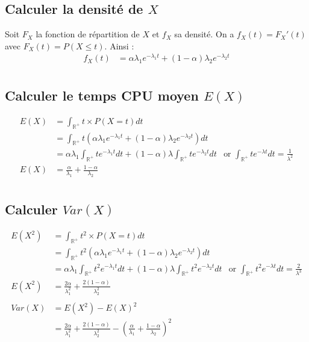 \documentclass[10pt,a4paper,twoside]{article}
\begin{document}
\subsection{Calculer la densité de $X$}
Soit $F_{X}$ la fonction de répartition de $X$ et $f_{X}$ sa densité. On a $f_{X}(t) = F_{X}'(t)$ avec $F_{X}(t) = P(X\leqslant t)$. Ainsi :
\begin{align*}
f_{X}(t) &= \alpha\lambda_{1} e^{-\lambda_{1}t} + (1-\alpha)\lambda_{2} e^{-\lambda_{2}t}\\
\end{align*}

\subsection{Calculer le temps CPU moyen $E(X)$}
\begin{align*}
E(X) &= \int_{\mathbb{R^{+}}} t \times P(X=t) dt\\
&= \int_{\mathbb{R^{+}}} t(\alpha\lambda_{1} e^{-\lambda_{1}t} + (1-\alpha)\lambda_{2} e^{-\lambda_{2}t})dt\\
&= \alpha\lambda_{1} \int_{\mathbb{R^{+}}}te^{-\lambda_{1}t}dt+(1-\alpha)\lambda\int_{\mathbb{R^{+}}}te^{-\lambda_{2}t}dt & \text{or }\int_{\mathbb{R^{+}}}te^{-\lambda t}dt = \frac{1}{\lambda^{2}}\\
E(X) &= \frac{\alpha}{\lambda_{1}}+\frac{1-\alpha}{\lambda_{2}}\\
\end{align*}

\subsection{Calculer $Var(X)$}
\begin{align*}
E(X^{2}) &= \int_{\mathbb{R^{+}}} t^{2} \times P(X=t) dt\\
&= \int_{\mathbb{R^{+}}} t^{2}(\alpha\lambda_{1} e^{-\lambda_{1}t} + (1-\alpha)\lambda_{2} e^{-\lambda_{2}t})dt\\
&= \alpha\lambda_{1} \int_{\mathbb{R^{+}}}t^{2}e^{-\lambda_{1}t}dt+(1-\alpha)\lambda\int_{\mathbb{R^{+}}}t^{2}e^{-\lambda_{2}t}dt & \text{or }\int_{\mathbb{R^{+}}}t^{2}e^{-\lambda t}dt = \frac{2}{\lambda^{3}}\\
E(X^{2}) &= \frac{2\alpha}{\lambda_{1}^{2}}+\frac{2(1-\alpha)}{\lambda_{2}^{2}}\\
\\
Var(X) &= E(X^{2})-E(X)^{2}\\
&= \frac{2\alpha}{\lambda_{1}^{2}}+\frac{2(1-\alpha)}{\lambda_{2}^{2}} - \left(\frac{\alpha}{\lambda_{1}}+\frac{1-\alpha}{\lambda_{2}}\right)^{2}\\
\end{align*}
\end{document}
